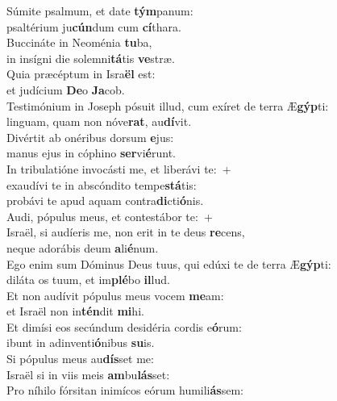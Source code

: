 \evenverse Súmite psalmum, et date \textbf{tým}panum:~\*\\
\evenverse psaltérium ju\textbf{cún}dum cum \textbf{cí}thara.\\
\oddverse Buccináte in Neoménia \textbf{tu}ba,~\*\\
\oddverse in insígni die solemni\textbf{tá}tis \textbf{ve}stræ.\\
\evenverse Quia præcéptum in Isra\textbf{ël} est:~\*\\
\evenverse et judícium \textbf{De}o \textbf{Ja}cob.\\
\oddverse Testimónium in Joseph pósuit illud, cum exíret de terra Æ\textbf{gýp}ti:~\*\\
\oddverse linguam, quam non nóve\textbf{rat}, au\textbf{dí}vit.\\
\evenverse Divértit ab onéribus dorsum \textbf{e}jus:~\*\\
\evenverse manus ejus in cóphino \textbf{ser}vi\textbf{é}runt.\\
\oddverse In tribulatióne invocásti me, et liberávi te:~+\\
\oddverse  exaudívi te in abscóndito tempe\textbf{stá}tis:~\*\\
\oddverse probávi te apud aquam contra\textbf{di}cti\textbf{ó}nis.\\
\evenverse Audi, pópulus meus, et contestábor te:~+\\
\evenverse  Israël, si audíeris me, non erit in te deus \textbf{re}cens,~\*\\
\evenverse neque adorábis deum \textbf{a}li\textbf{é}num.\\
\oddverse Ego enim sum Dóminus Deus tuus, qui edúxi te de terra Æ\textbf{gýp}ti:~\*\\
\oddverse diláta os tuum, et im\textbf{plé}bo \textbf{il}lud.\\
\evenverse Et non audívit pópulus meus vocem \textbf{me}am:~\*\\
\evenverse et Israël non in\textbf{tén}dit \textbf{mi}hi.\\
\oddverse Et dimísi eos secúndum desidéria cordis e\textbf{ó}rum:~\*\\
\oddverse ibunt in adinventi\textbf{ó}nibus \textbf{su}is.\\
\evenverse Si pópulus meus au\textbf{dís}set me:~\*\\
\evenverse Israël si in viis meis \textbf{am}bu\textbf{lás}set:\\
\oddverse Pro níhilo fórsitan inimícos eórum humili\textbf{ás}sem:~\*\\
